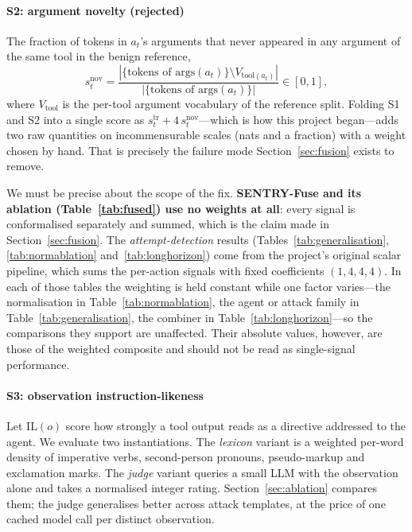 \documentclass[preprint,12pt,authoryear]{elsarticle}
\theoremstyle{definition}
\begin{document}
\paragraph{S2: argument novelty (rejected)}
The fraction of tokens in $a_t$'s arguments that never appeared in any argument of
the same tool in the benign reference,
\begin{equation}
s^{\mathrm{nov}}_t = \frac{|\{\text{tokens of } \mathrm{args}(a_t)\} \setminus
V_{\mathrm{tool}(a_t)}|}{|\{\text{tokens of } \mathrm{args}(a_t)\}|} \in [0,1],
\end{equation}
where $V_{\mathrm{tool}}$ is the per-tool argument vocabulary of the reference
split. Folding S1 and S2 into a single score as
$s^{\mathrm{tr}}_t + 4\,s^{\mathrm{nov}}_t$---which is how this project began---adds
two raw quantities on incommensurable scales (nats and a fraction) with a weight
chosen by hand. That
is precisely the failure mode Section~\ref{sec:fusion} exists to remove.

We must be precise about the scope of the fix.
\textbf{SENTRY-Fuse and its ablation (Table~\ref{tab:fused}) use no weights at
all}: every signal is conformalised separately and summed, which is the claim made
in Section~\ref{sec:fusion}. The \emph{attempt-detection} results
(Tables~\ref{tab:generalisation}, \ref{tab:normablation}
and~\ref{tab:longhorizon}) come from the project's original scalar pipeline, which
sums the per-action signals with fixed coefficients $(1, 4, 4, 4)$. In each of
those tables the weighting is held constant while one factor varies---the
normalisation in Table~\ref{tab:normablation}, the agent or attack family in
Table~\ref{tab:generalisation}, the combiner in
Table~\ref{tab:longhorizon}---so the comparisons they support are unaffected.
Their absolute values, however, are those of the weighted composite and should not
be read as single-signal performance.

\paragraph{S3: observation instruction-likeness}
Let $\mathrm{IL}(o)$ score how strongly a tool output reads as a directive
addressed to the agent. We evaluate two instantiations. The \emph{lexicon}
variant is a weighted per-word density of imperative verbs, second-person
pronouns, pseudo-markup and exclamation marks. The \emph{judge} variant queries a
small LLM with the observation alone and takes a normalised integer rating.
Section~\ref{sec:ablation} compares them; the judge generalises better across
attack templates, at the price of one cached model call per distinct observation.
\end{document}
